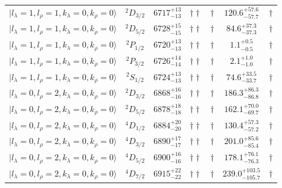 \begin{tabular}{c c| c c c c c }
$\vert l_{\lambda}\!\!=\!1, l_{\rho}\!\!=\!1, k_{\lambda}\!\!=\!0, k_{\rho}\!\!=\!0 \rangle$ & $^{2}D_{3/2}$ & $6717^{+13}_{-13}$ & $\dagger\dagger$ & $\dagger$ & $120.6^{+57.6}_{-57.7}$ & $\dagger$ \\ 
$\vert l_{\lambda}\!\!=\!1, l_{\rho}\!\!=\!1, k_{\lambda}\!\!=\!0, k_{\rho}\!\!=\!0 \rangle$ & $^{2}D_{5/2}$ & $6728^{+15}_{-15}$ & $\dagger\dagger$ & $\dagger$ & $84.6^{+37.3}_{-37.3}$ & $\dagger$ \\ 
$\vert l_{\lambda}\!\!=\!1, l_{\rho}\!\!=\!1, k_{\lambda}\!\!=\!0, k_{\rho}\!\!=\!0 \rangle$ & $^{2}P_{1/2}$ & $6720^{+13}_{-13}$ & $\dagger\dagger$ & $\dagger$ & $1.1^{+0.5}_{-0.5}$ & $\dagger$ \\ 
$\vert l_{\lambda}\!\!=\!1, l_{\rho}\!\!=\!1, k_{\lambda}\!\!=\!0, k_{\rho}\!\!=\!0 \rangle$ & $^{2}P_{3/2}$ & $6726^{+14}_{-14}$ & $\dagger\dagger$ & $\dagger$ & $2.1^{+1.0}_{-1.0}$ & $\dagger$ \\ 
$\vert l_{\lambda}\!\!=\!1, l_{\rho}\!\!=\!1, k_{\lambda}\!\!=\!0, k_{\rho}\!\!=\!0 \rangle$ & $^{2}S_{1/2}$ & $6724^{+13}_{-13}$ & $\dagger\dagger$ & $\dagger$ & $74.6^{+33.5}_{-33.7}$ & $\dagger$ \\ 
$\vert l_{\lambda}\!\!=\!0, l_{\rho}\!\!=\!2, k_{\lambda}\!\!=\!0, k_{\rho}\!\!=\!0 \rangle$ & $^{2}D_{3/2}$ & $6868^{+16}_{-16}$ & $\dagger\dagger$ & $\dagger$ & $186.3^{+86.3}_{-86.8}$ & $\dagger$ \\ 
$\vert l_{\lambda}\!\!=\!0, l_{\rho}\!\!=\!2, k_{\lambda}\!\!=\!0, k_{\rho}\!\!=\!0 \rangle$ & $^{2}D_{5/2}$ & $6878^{+18}_{-18}$ & $\dagger\dagger$ & $\dagger$ & $162.1^{+70.0}_{-69.7}$ & $\dagger$ \\ 
$\vert l_{\lambda}\!\!=\!0, l_{\rho}\!\!=\!2, k_{\lambda}\!\!=\!0, k_{\rho}\!\!=\!0 \rangle$ & $^{4}D_{1/2}$ & $6884^{+20}_{-20}$ & $\dagger\dagger$ & $\dagger$ & $130.4^{+57.3}_{-57.2}$ & $\dagger$ \\ 
$\vert l_{\lambda}\!\!=\!0, l_{\rho}\!\!=\!2, k_{\lambda}\!\!=\!0, k_{\rho}\!\!=\!0 \rangle$ & $^{4}D_{3/2}$ & $6890^{+17}_{-17}$ & $\dagger\dagger$ & $\dagger$ & $201.0^{+85.6}_{-85.4}$ & $\dagger$ \\ 
$\vert l_{\lambda}\!\!=\!0, l_{\rho}\!\!=\!2, k_{\lambda}\!\!=\!0, k_{\rho}\!\!=\!0 \rangle$ & $^{4}D_{5/2}$ & $6900^{+16}_{-16}$ & $\dagger\dagger$ & $\dagger$ & $178.1^{+76.1}_{-76.3}$ & $\dagger$ \\ 
$\vert l_{\lambda}\!\!=\!0, l_{\rho}\!\!=\!2, k_{\lambda}\!\!=\!0, k_{\rho}\!\!=\!0 \rangle$ & $^{4}D_{7/2}$ & $6915^{+22}_{-22}$ & $\dagger\dagger$ & $\dagger$ & $239.0^{+103.5}_{-105.7}$ & $\dagger$ \\ 
\hline \hline
\end{tabular}
